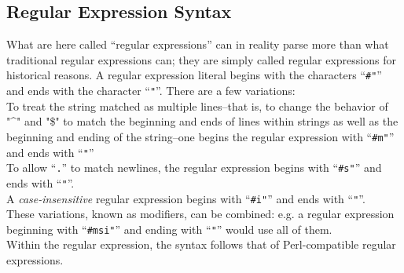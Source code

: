 \documentclass[10pt]{book}
\begin{document}
\subsection{Regular Expression Syntax}
What are here called ``regular expressions'' can in reality parse more than what traditional regular expressions can; they are simply called regular expressions for historical reasons.
A regular expression literal begins with the characters ``\texttt{\#"}'' and ends with the character ``\texttt{"}''. There are a few variations:\\
To treat the string matched as multiple lines--that is, to change the behavior of "\^{}" and "\$" to match the beginning and ends of lines within strings as well as the beginning and ending of the string--one begins the regular expression with ``\texttt{\#m"}'' and ends with ``\texttt{"}''\\
To allow ``\texttt{.}'' to match newlines, the regular expression begins with ``\texttt{\#s"}'' and ends with ``\texttt{"}''.\\
A \textit{case-insensitive} regular expression begins with ``\texttt{\#i"}'' and ends with ``\texttt{"}''.\\
These variations, known as modifiers, can be combined: e.g. a regular expression beginning with ``\texttt{\#msi"}'' and ending with ``\texttt{"}'' would use all of them.\\
Within the regular expression, the syntax follows that of Perl-compatible regular expressions.
\end{document}
